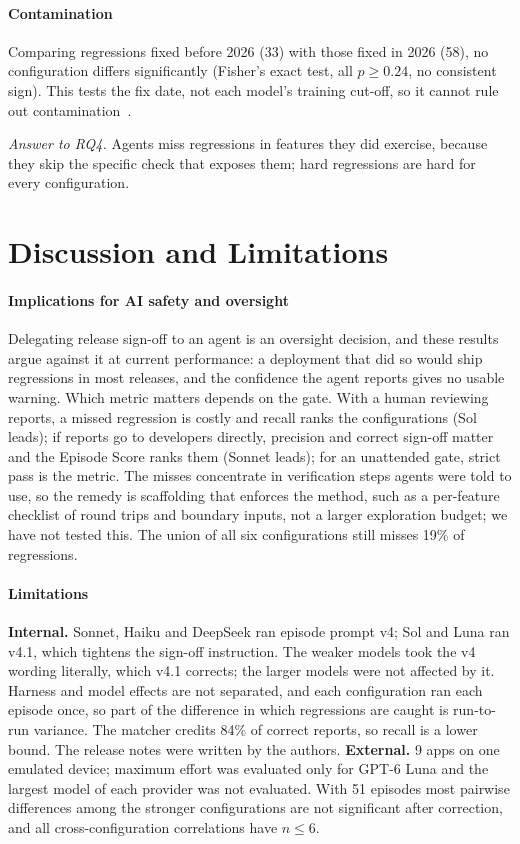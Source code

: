 \documentclass[10pt,letterpaper]{article}
\newcommand{\answer}[2]{\par\noindent\textit{Answer to RQ#1.} #2}
\begin{document}
\paragraph{Contamination}
Comparing regressions fixed before 2026 (33) with those fixed in 2026 (58), no configuration differs
significantly (Fisher's exact test, all $p\ge0.24$, no consistent sign). This tests the fix date, not
each model's training cut-off, so it cannot rule out contamination~\cite{sainz2023contamination}.
\answer{4}{Agents miss regressions in features they did exercise, because they skip the specific
check that exposes them; hard regressions are hard for every configuration.}

\section{Discussion and Limitations}
\paragraph{Implications for AI safety and oversight}
Delegating release sign-off to an agent is an oversight decision, and these results argue against it at
current performance: a deployment that did so would ship regressions in most releases, and the
confidence the agent reports gives no usable warning. Which metric matters depends on the gate. With a
human reviewing reports, a missed regression is costly and recall ranks the configurations (Sol leads);
if reports go to developers directly, precision and correct sign-off matter and the Episode Score
ranks them (Sonnet leads); for an unattended gate, strict pass is the metric. The misses
concentrate in verification steps agents were told to use, so the remedy is scaffolding that enforces the
method, such as a per-feature checklist of round trips and boundary inputs, not a larger exploration
budget; we have not tested this. The union of all six configurations still misses 19\% of regressions.

\paragraph{Limitations}\label{sec:threats}
\textbf{Internal.} Sonnet, Haiku and DeepSeek ran episode prompt v4; Sol and Luna ran v4.1, which
tightens the sign-off instruction. The weaker models took the v4 wording literally, which v4.1 corrects;
the larger models were not affected by it. Harness and model effects are not separated, and each
configuration ran each episode once, so part of the difference in which regressions are caught is
run-to-run variance. The matcher credits 84\% of correct reports, so recall is a lower bound. The release
notes were written by the authors.
\textbf{External.} 9 apps on one emulated device; maximum effort was evaluated only for GPT-6 Luna and the
largest model of each provider was not evaluated. With 51 episodes most pairwise differences among the
stronger configurations are not significant after correction, and all cross-configuration
correlations have $n\le6$.
\end{document}
